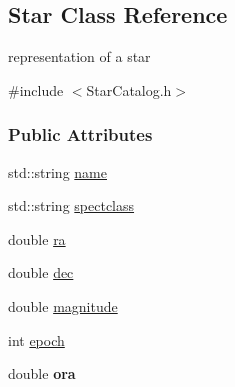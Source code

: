 \hypertarget{classStar}{
\subsection{Star Class Reference}
\label{classStar}
}


representation of a star  




{\ttfamily \#include $<$StarCatalog.h$>$}

\subsubsection*{Public Attributes}
\begin{DoxyCompactItemize}
\item 
\hypertarget{classStar_ad9ae4846172086e057c241d6a0f21636}{
std::string \hyperlink{classStar_ad9ae4846172086e057c241d6a0f21636}{name}}
\label{classStar_ad9ae4846172086e057c241d6a0f21636}

\item 
\hypertarget{classStar_a4b77ac656e25b91815237dc1899c4199}{
std::string \hyperlink{classStar_a4b77ac656e25b91815237dc1899c4199}{spectclass}}
\label{classStar_a4b77ac656e25b91815237dc1899c4199}

\item 
\hypertarget{classStar_a4e19502f3e68d6ccd8e5fde8d0fe84ac}{
double \hyperlink{classStar_a4e19502f3e68d6ccd8e5fde8d0fe84ac}{ra}}
\label{classStar_a4e19502f3e68d6ccd8e5fde8d0fe84ac}

\item 
\hypertarget{classStar_a69baf3896ff463864dec126ca56a2d58}{
double \hyperlink{classStar_a69baf3896ff463864dec126ca56a2d58}{dec}}
\label{classStar_a69baf3896ff463864dec126ca56a2d58}

\item 
\hypertarget{classStar_a2496dd6541fffff40255753b5981427e}{
double \hyperlink{classStar_a2496dd6541fffff40255753b5981427e}{magnitude}}
\label{classStar_a2496dd6541fffff40255753b5981427e}

\item 
\hypertarget{classStar_a30f20fcd99c18fc89f6d882af59f05c5}{
int \hyperlink{classStar_a30f20fcd99c18fc89f6d882af59f05c5}{epoch}}
\label{classStar_a30f20fcd99c18fc89f6d882af59f05c5}

\item 
\hypertarget{classStar_a91ee659802d043fe26d3538207232975}{
double {\bfseries ora}}
\label{classStar_a91ee659802d043fe26d3538207232975}


\end{DoxyCompactItemize}
